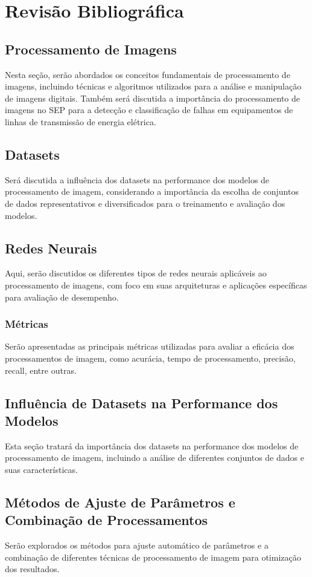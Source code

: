 \chapter{Revisão Bibliográfica}
\section{Processamento de Imagens}
Nesta seção, serão abordados os conceitos fundamentais de processamento de imagens, incluindo técnicas e algoritmos utilizados para a análise e manipulação de imagens digitais. Também será discutida a importância do processamento de imagens no SEP para a detecção e classificação de falhas em equipamentos de linhas de transmissão de energia elétrica.

\section{Datasets}
Será discutida a influência dos datasets na performance dos modelos de processamento de imagem, considerando a importância da escolha de conjuntos de dados representativos e diversificados para o treinamento e avaliação dos modelos.

\section{Redes Neurais}
Aqui, serão discutidos os diferentes tipos de redes neurais aplicáveis ao processamento de imagens, com foco em suas arquiteturas e aplicações específicas para avaliação de desempenho.

\subsection{Métricas}
Serão apresentadas as principais métricas utilizadas para avaliar a eficácia dos processamentos de imagem, como acurácia, tempo de processamento, precisão, recall, entre outras.

\section{Influência de Datasets na Performance dos Modelos}
Esta seção tratará da importância dos datasets na performance dos modelos de processamento de imagem, incluindo a análise de diferentes conjuntos de dados e suas características.

\section{Métodos de Ajuste de Parâmetros e Combinação de Processamentos}
Serão explorados os métodos para ajuste automático de parâmetros e a combinação de diferentes técnicas de processamento de imagem para otimização dos resultados.


